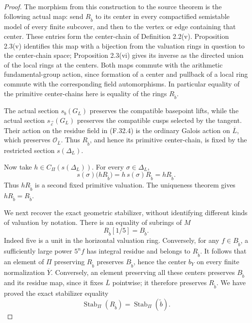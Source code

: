 \begin{proof}
The morphism from this construction to the
source theorem is the following actual map:
send $R_{\widetilde b}$ to its center in every
compactified semistable model of every finite
subcover, and then to the vertex or edge
containing that center.
These entries form the center-chain of
Definition 2.2(v).
Proposition 2.3(v) identifies this map with a
bijection from the valuation rings in question
to the center-chain space; Proposition 2.3(vi)
gives its inverse as the directed union of the
local rings at the centers.
Both maps commute with the arithmetic
fundamental-group action, since formation of a
center and pullback of a local ring commute
with the corresponding field automorphisms.
In particular equality of the primitive
center-chains here is equality of the rings
$R_{\widetilde b}$.

The actual section $s_b(G_L)$ preserves the
compatible basepoint lifts, while the actual
section $s_{\vec c}(G_L)$ preserves the
compatible cusps selected by the tangent.
Their action on the residue field in (F.32.4)
is the ordinary Galois action on $\overline L$,
which preserves $\mathcal O_{\overline L}$.
Thus $R_{\widetilde b}$, and hence its primitive
center-chain, is fixed by the restricted
section $s(\Delta_L)$.

Now take $h\in C_\Pi(s(\Delta_L))$.
For every $\sigma\in\Delta_L$,
\[
 s(\sigma)\bigl(hR_{\widetilde b}\bigr)
       =h\,s(\sigma)R_{\widetilde b}
       =hR_{\widetilde b}.
\]
Thus $hR_{\widetilde b}$ is a second fixed
primitive valuation.  The uniqueness theorem
gives $hR_{\widetilde b}=R_{\widetilde b}$.

We next recover the exact geometric stabilizer,
without identifying different kinds of
valuation by notation.
There is an equality of subrings of $M$
\[
 R_{\widetilde b}[1/5]=B_{\widetilde b}.                    \tag{F.32.6}
\]
Indeed five is a unit in the horizontal
valuation ring.  Conversely, for any
$f\in B_{\widetilde b}$, a sufficiently large
power $5^nf$ has integral residue and belongs
to $R_{\widetilde b}$.
It follows that an element of $\Pi$ preserving
$R_{\widetilde b}$ preserves
$B_{\widetilde b}$, hence the center $b_Y$
on every finite normalization $\overline Y$.
Conversely, an element preserving all these
centers preserves $B_{\widetilde b}$ and its
residue map, since it fixes $\overline L$
pointwise; it therefore preserves
$R_{\widetilde b}$.
We have proved the exact stabilizer equality
\[
 \operatorname{Stab}_\Pi(R_{\widetilde b})
       =\operatorname{Stab}_\Pi(\widetilde b).              \tag{F.32.7}
\]


\end{proof}
